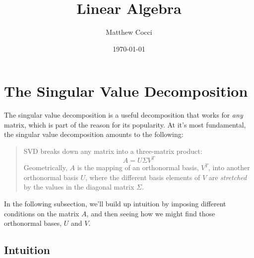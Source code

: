 \documentclass[12pt]{article}
\author{Matthew Cocci}
\title{Linear Algebra}
\date{\today}
\begin{document}


\section{The Singular Value Decomposition}

The singular value decomposition is a useful decomposition that works for \emph{any} matrix, which is part of the reason for its popularity. At it's most fundamental, the singular value decomposition amounts to the following:
\begin{quotation}
\noindent
SVD breaks down any matrix into a three-matrix product:
  \[
    A = U\Sigma V^T
\]
Geometrically, $A$ is the mapping of an orthonormal basis, $V^T$, into another orthonormal basis $U$, where the different basis elements of $V$ are \emph{stretched} by the values in the diagonal matrix $\Sigma$.
\end{quotation}
In the following subsection, we'll build up intuition by imposing different conditions on the matrix $A$, and then seeing how we might find those orthonormal bases, $U$ and $V$.


\subsection{Intuition}
\end{document}
